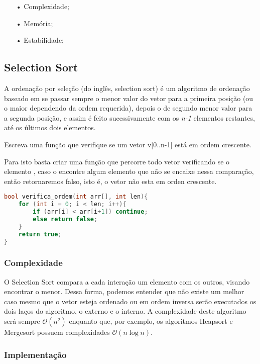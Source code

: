 \documentclass[10pt,a4paper]{article}
\begin{document}
\begin{itemize}
	\item[•] Complexidade;
	\item[•] Memória;
	\item[•] Estabilidade;
\end{itemize}


\subsection{Selection Sort}
A ordenação por seleção (do inglês, selection sort) é um algoritmo de ordenação baseado em se passar sempre o menor valor do vetor para a primeira posição (ou o maior dependendo da ordem requerida), depois o de segundo menor valor para a segunda posição, e assim é feito sucessivamente com os \textit{n-1} elementos restantes, até os últimos dois elementos.

\begin{ex}
	Escreva uma função que verifique se um vetor v[0..n-1] está em ordem crescente.
	\begin{eg}
		Para isto basta criar uma função que percorre todo vetor  verificando se o elemento , caso o encontre algum elemento que não se encaixe nessa comparação, então retornaremos falso, isto é, o vetor não esta em orden crescente.
	\end{eg}
\end{ex}
\begin{lstlisting}[language=C++, caption={Verificar se um vetor está em ordem crescente}]
bool verifica_ordem(int arr[], int len){
	for (int i = 0; i < len; i++){
		if (arr[i] < arr[i+1]) continue;
		else return false;
	}   			
	return true;
}
		\end{lstlisting}
\subsubsection{Complexidade}
O Selection Sort compara a cada interação um elemento com os outros, visando encontrar o menor. Dessa forma, podemos entender que não existe um melhor caso mesmo que o vetor esteja ordenado ou em ordem inversa serão executados os dois laços do algoritmo, o externo e o interno. A complexidade deste algoritmo será sempre $ \mathcal{O}(n^{2})$ enquanto que, por exemplo, os algoritmos Heapsort e Mergesort possuem complexidades $\mathcal{O}(n\log{}n)$.

\subsubsection{Implementação}
\end{document}
